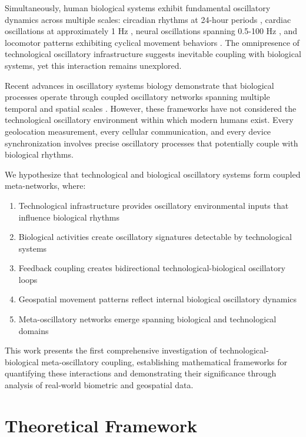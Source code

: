 \documentclass[12pt]{article}
\begin{document}
Simultaneously, human biological systems exhibit fundamental oscillatory dynamics across multiple scales: circadian rhythms at 24-hour periods \citep{takahashi2017transcriptional}, cardiac oscillations at approximately 1 Hz \citep{glass2001introduction}, neural oscillations spanning 0.5-100 Hz \citep{buzsaki2006rhythms}, and locomotor patterns exhibiting cyclical movement behaviors \citep{daan1976functional}. The omnipresence of technological oscillatory infrastructure suggests inevitable coupling with biological systems, yet this interaction remains unexplored.

Recent advances in oscillatory systems biology demonstrate that biological processes operate through coupled oscillatory networks spanning multiple temporal and spatial scales \citep{huygens2024universal}. However, these frameworks have not considered the technological oscillatory environment within which modern humans exist. Every geolocation measurement, every cellular communication, and every device synchronization involves precise oscillatory processes that potentially couple with biological rhythms.

We hypothesize that technological and biological oscillatory systems form coupled meta-networks, where:
\begin{enumerate}
\item Technological infrastructure provides oscillatory environmental inputs that influence biological rhythms
\item Biological activities create oscillatory signatures detectable by technological systems
\item Feedback coupling creates bidirectional technological-biological oscillatory loops
\item Geospatial movement patterns reflect internal biological oscillatory dynamics
\item Meta-oscillatory networks emerge spanning biological and technological domains
\end{enumerate}

This work presents the first comprehensive investigation of technological-biological meta-oscillatory coupling, establishing mathematical frameworks for quantifying these interactions and demonstrating their significance through analysis of real-world biometric and geospatial data.

\section{Theoretical Framework}
\end{document}
